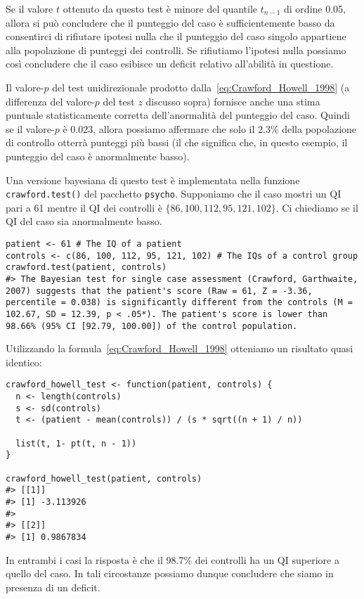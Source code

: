 Se il valore $t$ ottenuto da questo test è minore del quantile $t_{n-1}$ di ordine 0.05, allora si può concludere che il punteggio del caso è sufficientemente basso da consentirci di rifiutare ipotesi nulla che il punteggio del caso singolo appartiene alla popolazione di punteggi dei controlli.
Se rifiutiamo l'ipotesi nulla possiamo così concludere che il caso esibisce un deficit relativo all'abilità in questione.

Il valore-$p$ del test unidirezionale prodotto dalla~\eqref{eq:Crawford_Howell_1998} (a differenza del valore-$p$ del test $z$ discusso sopra) fornisce anche una stima puntuale statisticamente corretta dell'anormalità del punteggio del caso.
Quindi se il valore-$p$ è 0.023, allora possiamo affermare che solo il 2.3\% della popolazione di controllo otterrà punteggi più bassi (il che significa che, in questo esempio, il punteggio del caso è anormalmente basso).

\begin{exmp}

Una versione bayesiana di questo test è implementata nella funzione \verb+crawford.test()+ del pacchetto \verb+psycho+.
Supponiamo che il caso mostri un QI pari a 61 mentre il QI dei controlli è $\{86, 100, 112, 95, 121, 102\}$.
Ci chiediamo se il QI del caso sia anormalmente basso.

\begin{lstlisting}
patient <- 61 # The IQ of a patient
controls <- c(86, 100, 112, 95, 121, 102) # The IQs of a control group
crawford.test(patient, controls)
#> The Bayesian test for single case assessment (Crawford, Garthwaite, 2007) suggests that the patient's score (Raw = 61, Z = -3.36, percentile = 0.038) is significantly different from the controls (M = 102.67, SD = 12.39, p < .05*). The patient's score is lower than 98.66% (95% CI [92.79, 100.00]) of the control population.
\end{lstlisting}

Utilizzando la formula~\eqref{eq:Crawford_Howell_1998} otteniamo un risultato quasi identico:

\begin{lstlisting}
crawford_howell_test <- function(patient, controls) {
  n <- length(controls)
  s <- sd(controls)
  t <- (patient - mean(controls)) / (s * sqrt((n + 1) / n))
  
  list(t, 1- pt(t, n - 1))
}

crawford_howell_test(patient, controls)
#> [[1]]
#> [1] -3.113926
#> 
#> [[2]]
#> [1] 0.9867834
\end{lstlisting}
In entrambi i casi la risposta è che il 98.7\% dei controlli ha un QI superiore a quello del caso. 
In tali circostanze possiamo dunque concludere che siamo in presenza di un deficit.

\end{exmp}


